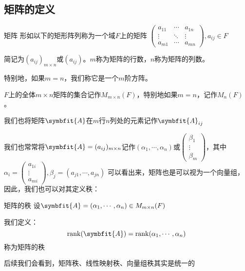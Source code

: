 \documentclass[12pt, a4paper, oneside, UTF8]{ctexbook}
\begin{document}
		\subsection{矩阵的定义}
			\begin{defn}{矩阵}{}
				形如以下的矩形阵列称为一个域$F$上的矩阵
				$\begin{pmatrix}
					a_{11} & \cdots & a_{1n} \\
					\vdots & \ddots & \vdots \\
					a_{m1} & \cdots & a_{mn}
				\end{pmatrix},a_{ij} \in F$

				简记为$(a_{ij})_{m \times n}$或$(a_{ij})$。$m$称为矩阵的行数，$n$称为矩阵的列数。

				特别地，如果$m=n$，我们称它是一个$m$阶方阵。

				$F$上的全体$m \times n$矩阵的集合记作$M_{m \times n} (F)$，特别地如果$m=n$，记作$M_n (F)$。

				我们也将矩阵$\symbfit{A}$在$m$行$n$列处的元素记作$\symbfit{A}_{ij}$
			\end{defn}
			我们也常常将$\symbfit{A}=(a_{ij})_{m \times n}$记作$(\alpha_1,\cdots,\alpha_n)$或$\begin{pmatrix}
				\beta_1 \\
				\vdots \\
				\beta_m
			\end{pmatrix}$，其中$\alpha_i = \begin{pmatrix}
				a_{1i} \\
				\vdots \\
				a_{mi}
			\end{pmatrix},\beta_j = (a_{j1},\cdots,a_{jn})$
			可以看出来，矩阵也是可以视为一个向量组，因此，我们也可以对其定义秩：
			\begin{defn}{矩阵的秩}{}
				设$\symbfit{A}=(\alpha_1,\cdots,\alpha_n) \in M_{m \times n}(F)$

				我们定义：
				\begin{equation}
					\rank(\symbfit{A})=\rank(\alpha_1,\cdots,\alpha_n)
				\end{equation}
				称为矩阵的秩
			\end{defn}
			后续我们会看到，矩阵秩、线性映射秩、向量组秩其实是统一的
\end{document}
